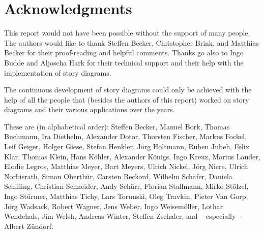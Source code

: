 \section*{Acknowledgments}

This report would not have been possible without the support of many people. The authors would like to thank Steffen Becker, Christopher Brink, and Matthias Becker for their proof-reading and helpful comments. Thanks go also to Ingo Budde and Aljoscha Hark for their technical support and their help with the implementation of story diagrams.

The continuous development of story diagrams could only be achieved with the help 
of all the people that (besides the authors of this report) worked on story diagrams and their various applications over the years.

These are (in alphabetical order): 
Steffen Becker, Manuel Bork, Thomas Buchmann, 
Ira Diethelm, Alexander Dotor, 
Thorsten Fischer, Markus Fockel,
Leif Geiger, Holger Giese, 
Stefan Henkler, J\"{o}rg Holtmann,
Ruben Jubeh,
Felix Klar, Thomas Klein, Hans K\"{o}hler, Alexander K\"{o}nigs, Ingo Kreuz, 
Marius Lauder, Elodie Legros,
Matthias Meyer, Bart Meyers, 
Ulrich Nickel, J\"{o}rg Niere, Ulrich Norbisrath,
Simon Oberth\"{u}r, 
Carsten Reckord, 
Wilhelm Sch\"{a}fer, Daniela Schilling, Christian Schneider, Andy Sch\"{u}rr, Florian Stallmann, Mirko St\"{o}lzel, Ingo St\"{u}rmer, 
Matthias Tichy, Lars Torunski, Oleg Travkin, 
Pieter Van Gorp, 
J\"{o}rg Wadsack, Robert Wagner, Jens Weber, Ingo Weisem\"{o}ller, Lothar Wendehals, Jim Welsh, Andreas Winter, 
Steffen Zschaler, and -- especially -- Albert Z\"{u}ndorf.